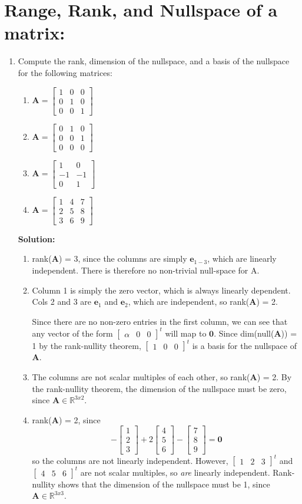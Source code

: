 \documentclass[]{article}
\newcommand{\R}{\mathbb{R}}				%
\newcommand{\bbm}{\begin{bmatrix}}		%
\newcommand{\ebm}{\end{bmatrix}}		%
\newcommand{\A}{\bm{A}}					%
\newcommand{\solution}{\vskip 0.5cm \textbf{\large Solution:} \\}
\begin{document}
    \section*{Range, Rank, and Nullspace of a matrix:}
    \begin{enumerate}[resume]
	\item Compute the rank, dimension of the nullspace, and a basis of the nullspace for the following matrices:
	  \begin{enumerate}
	  \item $\A = \bbm 1&0&0\\0&1&0\\0&0&1 \ebm$
	  \item $\A = \bbm 0&1&0\\0&0&1\\0&0&0 \ebm$
	  \item $\A = \bbm 1&0\\-1&-1\\0&1 \ebm$
	  \item $\A = \bbm 1&4&7\\2&5&8\\3&6&9 \ebm$
	  \end{enumerate}

	  \solution
	  \begin{enumerate}
	  \item rank($\A$) = 3, since the columns are simply $\bm{e}_{1-3}$,
        which are linearly independent. There is therefore no
        non-trivial null-space for A.
        
	  \item Column 1 is simply the zero vector, which is always
        linearly dependent. Cols 2 and 3 are $\bm{e}_1$ and
        $\bm{e}_2$, which are independent, so rank($\A$) = 2.

        Since there are no non-zero entries in the first column, we
        can see that any vector of the form $ \bbm \alpha & 0 & 0 \ebm^t$ will map
        to $\bm{0}$. Since dim(null($\A$)) = 1 by the rank-nullity
        theorem, $\bbm 1 & 0 & 0 \ebm^t$ is a basis for the nullspace of $\A$.

      \item The columns are not scalar multiples of each other, so
        rank($\A$) = 2. By the rank-nullity theorem, the dimension
        of the nullspace must be zero, since $\A \in \R^{3x2}$.

	  \item rank($\A$) = 2, since
        \[
         -\bbm 1 \\ 2 \\ 3 \ebm + 2 \bbm 4 \\ 5 \\ 6 \ebm - \bbm 7 \\ 8 \\ 9 \ebm = \bm{0}
        \]
        so the columns are not linearly independent. However, $\bbm 1
        & 2 & 3 \ebm^t$ and $\bbm 4 & 5 & 6 \ebm^t$ are not scalar
        multiples, so {\em are} linearly independent. Rank-nullity
        shows that the dimension of the nullspace must be 1, since
        $\A \in \R^{3x3}$.


\end{enumerate}
\end{enumerate}
\end{document}
